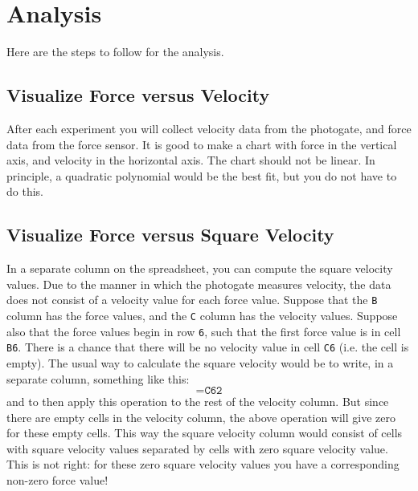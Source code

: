 \section{Analysis}
Here are the steps to follow for the analysis.
\subsection{Visualize Force versus Velocity}
After each experiment you will collect velocity data from the photogate, and force data from the force sensor. It is good to make a chart with force in the vertical axis, and velocity in the horizontal axis. The chart should not be linear. In principle, a quadratic polynomial would be the best fit, but you do not have to do this.
\subsection{Visualize Force versus Square Velocity}
In a separate column on the spreadsheet, you can compute the square velocity values. Due to the manner in which the photogate measures velocity, the data does not consist of a velocity value for each force value. Suppose that the \texttt{B} column has the force values, and the \texttt{C} column has the velocity values. Suppose also that the force values begin in row \texttt{6}, such that the first force value is in cell \texttt{B6}. There is a chance that there will be no velocity value in cell \texttt{C6} (i.e. the cell is empty). The usual way to calculate the square velocity would be to write, in a separate column, something like this:
\begin{equation}
    \texttt{=C6\^{}2}
\end{equation}
and to then apply this operation to the rest of the velocity column. But since there are empty cells in the velocity column, the above operation will give zero for these empty cells. This way the square velocity column would consist of cells with square velocity values separated by cells with zero square velocity value. This is not right: for these zero square velocity values you have a corresponding non-zero force value!

